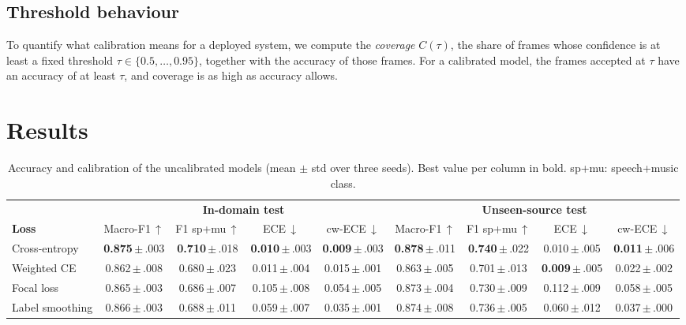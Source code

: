 \documentclass[conference]{IEEEtran}
\begin{document}
\subsection{Threshold behaviour}
To quantify what calibration means for a deployed system, we compute the \emph{coverage} $C(\tau)$, the share of frames whose confidence is at least a fixed threshold $\tau\in\{0.5,\dots,0.95\}$, together with the accuracy of those frames. For a calibrated model, the frames accepted at $\tau$ have an accuracy of at least $\tau$, and coverage is as high as accuracy allows.

\section{Results}\label{sec:results}

\begin{table}[t]
\caption{Accuracy and calibration of the uncalibrated models (mean $\pm$ std over three seeds). Best value per column in bold. sp+mu: speech+music class.}
\label{tab:main}
\centering
\footnotesize
\setlength{\tabcolsep}{4.5pt}
\begin{tabular}{@{}lcccc|cccc@{}}
\toprule
& \multicolumn{4}{c|}{\textbf{In-domain test}} & \multicolumn{4}{c}{\textbf{Unseen-source test}} \\
\textbf{Loss} & Macro-F1\,$\uparrow$ & F1 sp+mu\,$\uparrow$ & ECE\,$\downarrow$ & cw-ECE\,$\downarrow$ & Macro-F1\,$\uparrow$ & F1 sp+mu\,$\uparrow$ & ECE\,$\downarrow$ & cw-ECE\,$\downarrow$ \\
\midrule
Cross-entropy & \textbf{0.875}\,$\pm$\,.003 & \textbf{0.710}\,$\pm$\,.018 & \textbf{0.010}\,$\pm$\,.003 & \textbf{0.009}\,$\pm$\,.003 & \textbf{0.878}\,$\pm$\,.011 & \textbf{0.740}\,$\pm$\,.022 & 0.010\,$\pm$\,.005 & \textbf{0.011}\,$\pm$\,.006 \\
Weighted CE & 0.862\,$\pm$\,.008 & 0.680\,$\pm$\,.023 & 0.011\,$\pm$\,.004 & 0.015\,$\pm$\,.001 & 0.863\,$\pm$\,.005 & 0.701\,$\pm$\,.013 & \textbf{0.009}\,$\pm$\,.005 & 0.022\,$\pm$\,.002 \\
Focal loss & 0.865\,$\pm$\,.003 & 0.686\,$\pm$\,.007 & 0.105\,$\pm$\,.008 & 0.054\,$\pm$\,.005 & 0.873\,$\pm$\,.004 & 0.730\,$\pm$\,.009 & 0.112\,$\pm$\,.009 & 0.058\,$\pm$\,.005 \\
Label smoothing & 0.866\,$\pm$\,.003 & 0.688\,$\pm$\,.011 & 0.059\,$\pm$\,.007 & 0.035\,$\pm$\,.001 & 0.874\,$\pm$\,.008 & 0.736\,$\pm$\,.005 & 0.060\,$\pm$\,.012 & 0.037\,$\pm$\,.000 \\
\bottomrule
\end{tabular}
\end{table}
\end{document}
